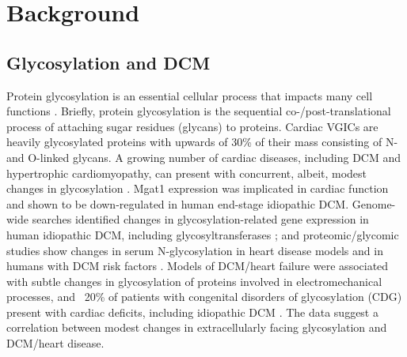 \documentclass[10pt,letterpaper]{article}
\begin{document}
\section*{Background}
\subsection*{Glycosylation and DCM}
Protein glycosylation is an essential cellular process that impacts many cell functions \cite{marques2017cardiac}. Briefly, protein glycosylation is the sequential co-/post-translational process of attaching sugar residues (glycans) to proteins. Cardiac VGICs are heavily glycosylated proteins with upwards of 30\% of their mass consisting of N- and O-linked glycans. A growing number of cardiac diseases, including DCM and hypertrophic cardiomyopathy, can present with concurrent, albeit, modest changes in glycosylation \cite{gehrmann2003cardiomyopathy, footitt2009cardiomyopathy, molina2013differential, marques2017cardiac}. Mgat1 expression was implicated in cardiac function and shown to be down-regulated in human end-stage idiopathic DCM. Genome-wide searches identified changes in glycosylation-related gene expression in human idiopathic DCM, including glycosyltransferases \cite{barrans2002global, hwang2002microarray, yung2004gene}; and proteomic/glycomic studies show changes in serum N-glycosylation in heart disease models and in humans with DCM risk factors \cite{nishio1995identification, knezevic2009variability, miura2016glycomics, nagai2016aberrant, yang2015glycoproteins}. Models of DCM/heart failure were associated with subtle changes in glycosylation of proteins involved in electromechanical processes, and ~20\% of patients with congenital disorders of glycosylation (CDG) present with cardiac deficits, including idiopathic DCM \cite{gehrmann2003cardiomyopathy, marques2017cardiac}. The data suggest a correlation between modest changes in extracellularly facing glycosylation and DCM/heart disease. 
\end{document}
